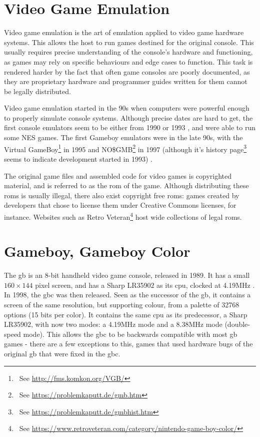 \documentclass[11pt]{informatics-report}
\newcommand{\ftnt}[1]{\footnote{~See \url{#1}}}
\begin{document}
\section{Video Game Emulation}

Video game emulation is the art of emulation applied to video game hardware systems. This allows the host to run games destined for the original console. This usually requires precise understanding of the console's hardware and functioning, as games may rely on specific behaviours and edge cases to function. This task is rendered harder by the fact that often game consoles are poorly documented, as they are proprietary hardware and programmer guides written for them cannot be legally distributed.

Video game emulation started in the 90s when computers were powerful enough to properly simulate console systems. Although precise dates are hard to get, the first console emulators seem to be either from 1990 or 1993 \cite{first_nes_emu}, and were able to run some NES games. The first Gameboy emulators were in the late 90s, with the Virtual GameBoy\ftnt{http://fms.komkon.org/VGB/} in 1995 and NO\$GMB\ftnt{https://problemkaputt.de/gmb.htm} in 1997 (although it's history page\ftnt{https://problemkaputt.de/gmbhist.htm} seems to indicate development started in 1993) \cite{first_gb_emus}.

The original game files and assembled code for video games is copyrighted material, and is referred to as the \gls{rom} of the game. Although distributing these \glspl{rom} is usually illegal, there also exist copyright free \glspl{rom}: games created by developers that chose to license them under Creative Commons licenses, for instance. Websites such as Retro Veteran\ftnt{https://www.retroveteran.com/category/nintendo-game-boy-color/} host wide collections of legal \glspl{rom}.

\section{Gameboy, Gameboy Color}

The \gls{gb} is an 8-bit handheld video game console, released in 1989. It has a small $160 \times 144$ pixel screen, and has a Sharp LR35902 as its \gls{cpu}, clocked at 4.19MHz \cite[Specifications]{pandoc}. In 1998, the \gls{gbc} was then released. Seen as the successor of the \gls{gb}, it contains a screen of the same resolution, but supporting colour, from a palette of 32768 options (15 bits per color). It contains the same \gls{cpu} as its predecessor, a Sharp LR35902, with now two modes: a 4.19MHz mode and a 8.38MHz mode (double-speed mode). This allows the \gls{gbc} to be backwards compatible with most \gls{gb} games - there are a few exceptions to this, games that used hardware bugs of the original \gls{gb} that were fixed in the \gls{gbc}.
\end{document}
